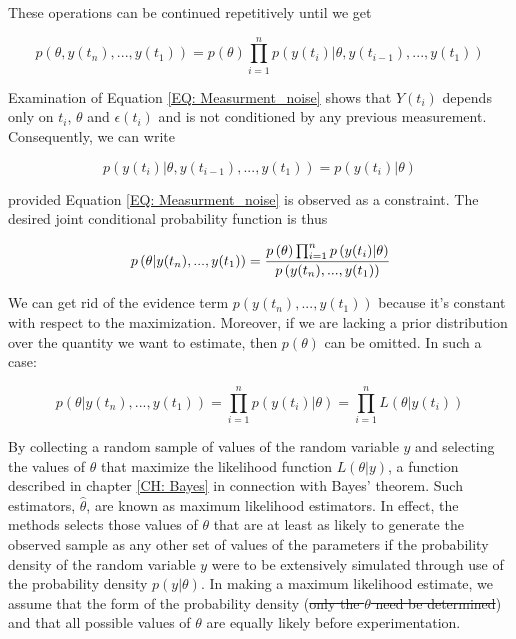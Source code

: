 \documentclass[a4paper,fleqn]{cas-dc}
\begin{document}
These operations can be continued repetitively until we get

{\footnotesize
	\begin{equation}
		p\left( \theta, y(t_n),...,y(t_1) \right) = p\left( \theta \right) \prod_{i=1}^{n} p\left( y(t_i)|\theta, y(t_{i-1}),...,y(t_1) \right)
\end{equation} }

Examination of Equation \ref{EQ: Measurment_noise} shows that $ Y(t_i)$ depends only on $t_i$, $\theta$ and $\epsilon(t_i)$ and is not conditioned by any previous measurement. Consequently, we can write 

{\footnotesize
	\begin{equation}
		p\left( y(t_i)|\theta, y(t_{i-1}),...,y(t_1) \right) = p\left( y(t_i)|\theta \right)
\end{equation} }

provided Equation \ref{EQ: Measurment_noise} is observed as a constraint. The desired joint conditional probability function is thus

{\footnotesize
	\begin{equation}
		p\left( \theta| y(t_n),...,y(t_1) \right) = \cfrac{p\left( \theta \right) \prod_{i=1}^{n} p\left( y(t_i)|\theta \right) }{p\left( y(t_n),...,y(t_1) \right)}
\end{equation} }

We can get rid of the evidence term $p\left( y(t_n),...,y(t_1) \right)$ because it's constant with respect to the maximization. Moreover, if we are lacking a prior distribution over the quantity we want to estimate, then $p(\theta)$ can be omitted. In such a case:

{\footnotesize
	\begin{equation}
		p\left( \theta| y(t_n),...,y(t_1) \right) = \prod_{i=1}^{n} p\left( y(t_i)|\theta \right) = \prod_{i=1}^{n} L\left( \theta|y(t_i) \right) 
\end{equation} }

By collecting a random sample of values of the random variable $y$ and selecting the values of $\theta$ that maximize the likelihood function $L\left( \theta | y \right)$, a function described in chapter \ref{CH: Bayes} in connection with Bayes' theorem. Such estimators, $\hat{\theta}$, are known as maximum likelihood estimators. In effect, the methods selects those values of $\theta$ that are at least as likely to generate the observed sample as any other set of values of the parameters if the probability density of the random variable $y$ were to be extensively simulated through use of the probability density $p\left( y|\theta \right)$. In making a maximum likelihood estimate, we assume that the form of the probability density (\sout{only the $\theta$ need be determined}) and that all possible values of $\theta$ are equally likely before experimentation.
\end{document}
